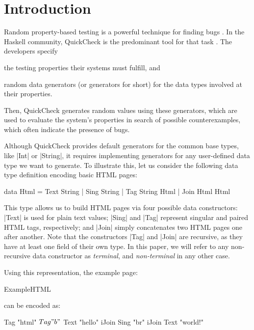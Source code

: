 \section{Introduction}
\label{sec:intro}

%
Random property-based testing is a powerful technique for finding bugs
\cite{ArtsHNS15, HughesPAN16, HughesNSA16, MidtgaardJKNN17}.
%
In the Haskell community, QuickCheck is the predominant tool for that task
\cite{ClaessenH00}.
%
The developers specify
%
\begin{inparaenum}[(i)]
\item the testing properties their systems must fulfill, and
\item random data generators (or generators for short) for the data types
  involved at their properties.
\end{inparaenum}
%
Then, QuickCheck generates random values using these generators, which are used
to evaluate the system's properties in search of possible counterexamples, which
often indicate the presence of bugs.


%
Although QuickCheck provides default generators for the common base types, like
|Int| or |String|, it requires implementing generators for any user-defined data
type we want to generate.
%
%
To illustrate this, let us consider the following data type definition encoding
basic HTML pages:

\begin{code}
data Html  =  Text  String
           |  Sing  String
           |  Tag   String Html
           |  Join  Html Html
\end{code}
%
This type allows us to build HTML pages via four possible data constructors:
|Text| is used for plain text values; |Sing| and |Tag| represent singular and
paired HTML tags, respectively; and |Join| simply concatenates two HTML pages
one after another.
%
Note that the constructors |Tag| and |Join| are recursive, as they have at least
one field of their own type.
%
In this paper, we will refer to any non-recursive data constructor as
\emph{terminal}, and \emph{non-terminal} in any other case.


Using this representation, the example page:

\begin{code}
ExampleHTML
\end{code}
%
can be encoded as:
%
\begin{code}
Tag "html" $ Tag "b" $
  Text "hello" iJoin Sing "br" iJoin Text "world!"
\end{code} %


